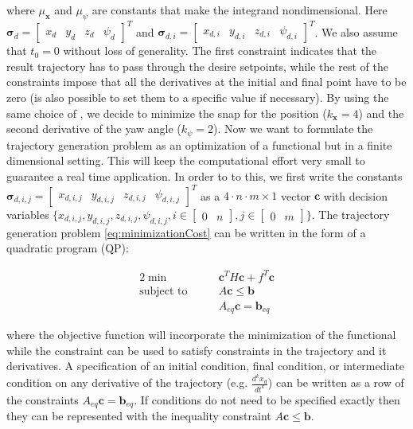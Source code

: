 \noindent where $\mu_{\mathbf{x}}$ and $\mu_{\psi}$ are constants that make the integrand nondimensional. Here $\boldsymbol{\sigma}_d = \begin{bmatrix} x_d & y_d & z_d & \psi_d\end{bmatrix}^T$ and $\boldsymbol{\sigma}_{d,i}=\begin{bmatrix}x_{d,i} & y_{d,i} & z_{d,i} & \psi_{d,i}\end{bmatrix}^T$. We also assume that $t_0=0$ without loss of generality. The first constraint indicates that the result trajectory has to pass through the desire setpoints, while the rest of the constraints impose that all the derivatives at the initial and final point have to be zero (is also possible to set them to a specific value if necessary). By using the same choice of \cite{minimumSnap2}, we decide to minimize the snap for the position ($k_{\mathbf{x}}=4$) and the second derivative of the yaw angle ($k_{\psi}=2$). Now we want to formulate the trajectory generation problem as an optimization of a functional but in a finite dimensional setting. This will keep the computational effort very small to guarantee a real time application. In order to to this, we first write the constants $\boldsymbol{\sigma}_{d,i,j} =\begin{bmatrix}x_{d,i,j} & y_{d,i,j} & z_{d,i,j} & \psi_{d,i,j}\end{bmatrix}^T$ as a $4\cdot n\cdot m\times 1$ vector $\mathbf{c}$ with decision variables $\{x_{d,i,j} , y_{d,i,j} , z_{d,i,j} , \psi_{d,i,j}, i \in \begin{bmatrix}0 & n\end{bmatrix}, j \in \begin{bmatrix}0 & m\end{bmatrix}\}$. The trajectory generation problem \eqref{eq:minimizationCost} can be written in the form of a quadratic program (QP):

\begin{alignat}{2}
	\min\qquad & \mathbf{c}^TH\mathbf{c} + f^T\mathbf{c} \\
	\text{subject to}\qquad & A\mathbf{c} \le \mathbf{b} \nonumber \\
	& A_{eq}\mathbf{c} = \mathbf{b}_{eq} \nonumber
	\label{eq:quadraticProgram}
\end{alignat}

\noindent where the objective function will incorporate the minimization of the functional while the constraint can be used to satisfy constraints in the trajectory and it derivatives. A specification of an initial condition, final condition, or intermediate condition on any derivative of the trajectory (e.g. $\frac{d^kx_d}{dt^k}$) can be written as a row of the constraints $A_{eq}\mathbf{c} = \mathbf{b}_{eq}$. If conditions do not need to be
specified exactly then they can be represented with the inequality constraint $A\mathbf{c}\le \mathbf{b}$.

